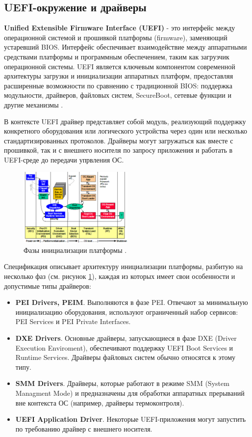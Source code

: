 \subsection{UEFI-окружение и драйверы}
\textbf{Unified Extensible Firmware Interface (UEFI)} - это интерфейс между операционной системой и прошивкой платформы (firmware), заменяющий устаревший BIOS.  Интерфейс обеспечивает взаимодействие между аппаратными средствами платформы и программным обеспечением, таким как загрузчик операционной системы. UEFI является ключевым компонентом современной архитектуры загрузки и инициализации аппаратных платформ, предоставляя расширенные возможности по сравнению с традиционной BIOS: поддержка модульности, драйверов, файловых систем, SecureBoot, сетевые функции и другие механизмы \cite{UEFISpec}.

В контексте UEFI драйвер представляет собой модуль, реализующий поддержку конкретного оборудования или логического устройства через один или несколько стандартизированных протоколов. Драйверы могут загружаться как вместе с прошивкой, так и с внешнего носителя по запросу приложения и работать в UEFI-среде до передачи упрвления ОС.

\begin{figure}[htbp]
	\centering %
	\includegraphics[width=0.5\textwidth]{piphases.png} %
	\caption{Фазы инициализации платформы \cite{UEFIPI}.} %
	\label{intro:piphases} %
\end{figure}
Спецификация \cite{UEFIPI} описывает архитектуру инициализации платформы, разбитую на несколько фаз (см. рисунок \ref{intro:piphases}), каждая из которых имеет свои особенности и допустимые типы драйверов:
\begin{itemize}
	\item \textbf{PEI Drivers, PEIM}. Выполняются в фазе PEI. Отвечают за минимальную инициализацию оборудования, используют ограниченный набор сервисов: PEI Services и PEI Private Interfaces.
	\item \textbf{DXE Drivers}. Основные драйверы, запускающиеся в фазе DXE (Driver Execution Enviroment), обеспечивают поддержку UEFI Boot Services и Runtime Services. Драйверы файловых систем обычно относятся к этому типу.
	\item \textbf{SMM Drivers}. Драйверы, которые работают в режиме SMM (System Managment Mode) и предназначены для обработки аппаратных прерываний вне контекста ОС (например, драйверы термоконтроля).
	\item \textbf{UEFI Application Driver}. Некоторые UEFI-приложения могут запустить по требованию драйвер с внешнего носителя.
\end{itemize} 

